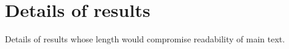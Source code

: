 \chapter{Details of results}
         Details of results whose length would compromise readability of main text.